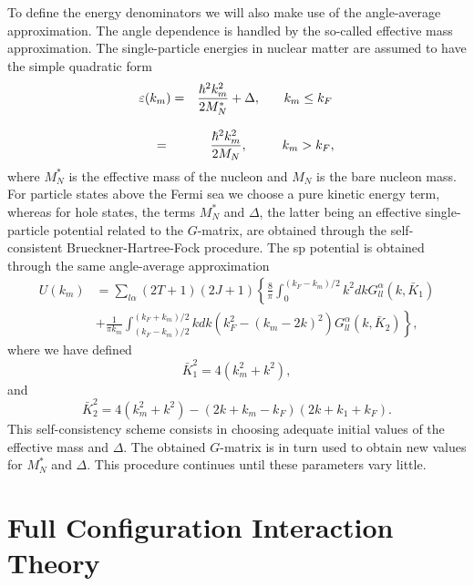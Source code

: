 To define the energy denominators we will also make use of the
angle-average approximation.
The angle dependence is handled by the
so-called effective mass approximation. The single-particle energies
in nuclear matter are assumed to have the simple quadratic form
\begin{equation}
   \begin{array}{ccc}
   \varepsilon (k_m)=&
   {\displaystyle\frac{\hbar^{2}k_m^2}
   {2M_{N}^{*}}}+\Delta ,&\hspace{3mm}k_m\leq k_F\\
   &&\\
   =&{\displaystyle\frac{\hbar^{2}
   k_m^2}{2M_{N}}},&\hspace{3mm}k_m> k_F ,\\
   \end{array}
   \label{eq:spen}
\end{equation}
where $M_{N}^{*}$ is the effective mass of the nucleon and $M_{N}$ is the
bare nucleon mass. For particle states above the Fermi sea we choose
a pure kinetic energy term, whereas for hole states,
the terms $M_{N}^{*}$ and $\Delta$, the latter being 
an effective single-particle
potential related to the $G$-matrix, are obtained through the
self-consistent Brueckner-Hartree-Fock procedure.
The sp potential is obtained through the same angle-average approximation
\begin{align}
  \label{eq:Uav}
   U(k_m) & =\sum_{l\alpha} (2T+1)(2J+1)
   \left \{ \frac{8}{\pi}\int_{0}^{(k_F-k_m)/2}
   k^2dk G_{ll}^{\alpha}(k,\bar{K}_1) \right.  \\
   &    \left.
    + \frac{1}{\pi k_m}\int_{(k_F-k_m)/2}^{(k_F+k_m)/2}
   kdk (k_F ^2-(k_m-2k)^2)
   G_{ll}^{\alpha}(k,\bar{K}_2)  \right \}  \nonumber,
\end{align}
where we have defined
\begin{equation}
    \bar{K}_1^2=4(k_m^2+k^2),
\end{equation}
and
\begin{equation}
    \bar{K}_2^2=4(k_m^2+k^2)-(2k+k_m-k_F)(2k+k_1+k_F).
\end{equation}
This
self-consistency scheme consists in choosing adequate initial values of the
effective mass and $\Delta$. The obtained $G$-matrix is in turn used to
obtain new values for $M_{N}^{*}$ and $\Delta$. This procedure
continues until these parameters vary little.





\section{Full Configuration Interaction Theory}

